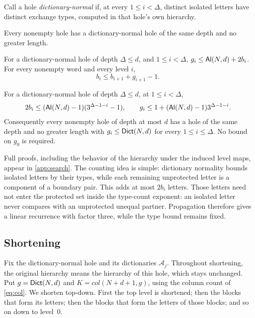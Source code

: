 Call a hole \emph{dictionary-normal} if, at every $1\le i<\Delta$, distinct isolated
letters have distinct exchange types, computed in that hole's own hierarchy.
\begin{lemma}\label{lem:dictionary-normal-form}
Every nonempty hole has a dictionary-normal hole of the same depth and no
greater length.
\end{lemma}
\begin{lemma}\label{lem:dictionary-count}
For a dictionary-normal hole of depth $\Delta\le d$, and $1\le i<\Delta$,
$g_i\le \mathsf{Al}(N,d)+2b_i$.
For every nonempty word and every level $i$,
\begin{equation}\label{eq:boundary-propagation}
 b_i\le b_{i+1}+g_{i+1}-1.
\end{equation}
\end{lemma}
\begin{lemma}\label{lem:dictionary-bound}
For a dictionary-normal hole of depth $\Delta\le d$, at $1\le i<\Delta$,
\begin{equation}\label{eq:dictionary-recurrence}
 2b_i\le(\mathsf{Al}(N,d)-1)(3^{\Delta-1-i}-1),\qquad
 g_i\le1+(\mathsf{Al}(N,d)-1)3^{\Delta-1-i}.
\end{equation}
Consequently every nonempty hole of depth at most $d$ has a hole of the
same depth and no greater length with $g_i\le \mathsf{Dict}(N,d)$ for every
$1\le i\le \Delta$. No bound on $g_0$ is required.
\end{lemma}

Full proofs, including the behavior of the hierarchy under the induced
level maps, appear in \cref{app:search}. The counting idea is simple:
dictionary normality bounds isolated letters by their types, while each remaining
unprotected letter is a component of a boundary pair. This adds at most
$2b_i$ letters. Those letters need not enter the protected set
inside the type-count exponent: an isolated letter never compares with
an unprotected unequal partner. Propagation therefore gives a linear
recurrence with factor three, while the type bound remains fixed.

\subsection{Shortening}\label{sec:shortening}

Fix the dictionary-normal hole and its dictionaries $\mathcal A_j$. Throughout
shortening, the original hierarchy means the hierarchy of this hole, which stays
unchanged. Put $g=\mathsf{Dict}(N,d)$ and
$K=\mathit{col}(N+d+1,g)$, using the column count of \eqref{eq:col}.
We shorten top-down.
First the top level is shortened; then the blocks that form its
letters; then the blocks that form the letters of those blocks; and so on down to level~$0$.

